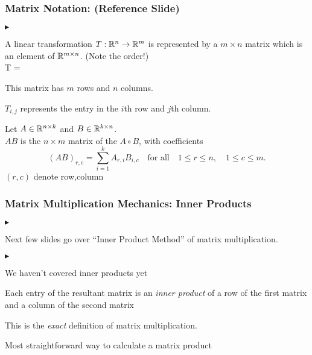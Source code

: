 \documentclass[table]{beamer}
\renewenvironment{itemize}
\newcommand\fonteight{\fontsize{8}{9.6}\selectfont}
\newcommand\fonttwelve{\fontsize{12}{1.44}\selectfont}
\renewenvironment{itemize}%
{\begin{list}{$\blacktriangleright$}%
      {\setlength{\leftmargin}{2.5em}%
       \setlength{\itemsep}{-\parsep}%
       \setlength{\topsep}{-\parskip}%
       \usecounter{enumi}}%
 }{\end{list}}
\begin{document}

\begin{frame}
\frametitle{Matrix Notation: (Reference Slide)}
\begin{itemize}
\fonttwelve
\item A linear transformation $ T: \mathbb{R}^n \to \mathbb{R}^m$ is represented by a $m \times n $ matrix
which is an element of $\mathbb{R}^{m\times n}$. (Note the order!)\\
\fonteight
T = 
\\
\fonttwelve
\medskip
\item This matrix has $m$ rows and $n$ columns. \\
\item $T_{i,j}$ represents the entry in the $i$th row and $j$th column.

\begin{definition}
\fonteight
	Let $A \in \mathbb{R}^{n \times k}$ and $B \in \mathbb{R}^{k \times n}$. \\
	$AB$ is the $n \times m$ matrix of the $A \circ B$, with coefficients
	$$
	(AB)_{r,c} = \sum_{i=1}^k A_{r,i} B_{i,c} \quad \text{for all} \quad 1 \leq r \leq n, \quad 1 \leq c \leq m.
	$$
$(r,c)$ denote row,column
\end{definition}
\end{itemize}
\end{frame}

\begin{frame}
\frametitle{Matrix Multiplication Mechanics: Inner Products}

\begin{itemize}
\item Next few slides go over ``Inner Product Method'' of matrix multiplication.
\begin{itemize}
\item We haven't covered inner products yet
\end{itemize}
\item Each entry of the resultant matrix is an \textit{inner product} of a row of the first matrix and a column of the second matrix
\item This is the \textit{exact} definition of matrix multiplication.\\
\item Most straightforward way to calculate a matrix product
\end{itemize}
\end{frame}
\end{document}
